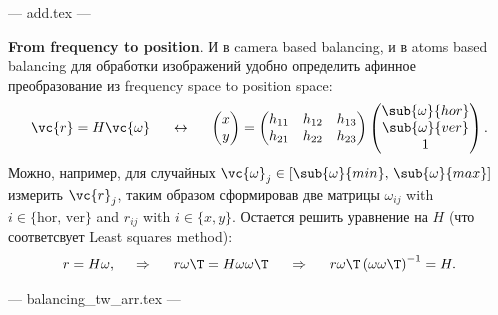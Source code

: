 --- add.tex ---

\textbf{From frequency to position}. И в camera based balancing, и в atoms based balancing для обработки изображений удобно определить афинное преобразование из frequency space to position space:
\begin{equation*}
	\vc{r} = H \vc{\omega}
	\hspace{5 mm} \leftrightarrow \hspace{5 mm} 
	\begin{pmatrix}
		x \\ y
	\end{pmatrix} = \begin{pmatrix}
		h_{11} & h_{12} & h_{13} \\
		h_{21} & h_{22} & h_{23} \\
	\end{pmatrix} 
	\begin{pmatrix}
		\sub{\omega}{hor} \\
		\sub{\omega}{ver} \\
		1
	\end{pmatrix}.
\end{equation*}
Можно, например, для случайных $\vc{\omega}_j \in [\sub{\omega}{min},\, \sub{\omega}{max}]$ измерить $\vc{r}_j$, таким образом сформировав две матрицы $\omega_{ij}$ with $i \in \{\mathrm{hor},\, \mathrm{ver}\}$ and $r_{ij}$ with $i \in \{x, y\}$. Остается решить уравнение на $H$ (что соответсвует Least squares method):
\begin{equation}
	r = H \omega,
	\hspace{0.5cm} \Rightarrow \hspace{0.5cm}
	r \omega\T = H \omega \omega\T
	\hspace{0.5cm} \Rightarrow \hspace{0.5cm}
	r \omega\T \left(\omega \omega\T\right)^{-1} = H.
	\label{LinReg:freq2pos}
\end{equation}

--- balancing_tw_arr.tex ---




